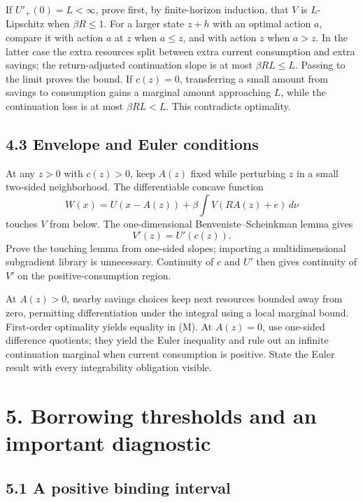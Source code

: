 \documentclass[
  11pt,
]{article}
\begin{document}
If \(U'_+(0)=L<\infty\), prove first, by finite-horizon induction, that
\(V\) is \(L\)-Lipschitz when \(\beta R\leq1\). For a larger state
\(z+h\) with an optimal action \(a\), compare it with action \(a\) at
\(z\) when \(a\leq z\), and with action \(z\) when \(a>z\). In the
latter case the extra resources split between extra current consumption
and extra savings; the return-adjusted continuation slope is at most
\(\beta RL\leq L\). Passing to the limit proves the bound. If
\(c(z)=0\), transferring a small amount from savings to consumption
gains a marginal amount approaching \(L\), while the continuation loss
is at most \(\beta RL<L\). This contradicts optimality.

\subsection{4.3 Envelope and Euler
conditions}\label{envelope-and-euler-conditions}

At any \(z>0\) with \(c(z)>0\), keep \(A(z)\) fixed while perturbing
\(z\) in a small two-sided neighborhood. The differentiable concave
function \[
W(x)=U(x-A(z))+\beta\int V(RA(z)+e)\,d\nu
\] touches \(V\) from below. The one-dimensional Benveniste--Scheinkman
lemma gives \[
V'(z)=U'(c(z)).
\] Prove the touching lemma from one-sided slopes; importing a
multidimensional subgradient library is unnecessary. Continuity of \(c\)
and \(U'\) then gives continuity of \(V'\) on the positive-consumption
region.

At \(A(z)>0\), nearby savings choices keep next resources bounded away
from zero, permitting differentiation under the integral using a local
marginal bound. First-order optimality yields equality in (M). At
\(A(z)=0\), use one-sided difference quotients; they yield the Euler
inequality and rule out an infinite continuation marginal when current
consumption is positive. State the Euler result with every integrability
obligation visible.

\section{5. Borrowing thresholds and an important
diagnostic}\label{borrowing-thresholds-and-an-important-diagnostic}

\subsection{5.1 A positive binding
interval}\label{a-positive-binding-interval}
\end{document}
